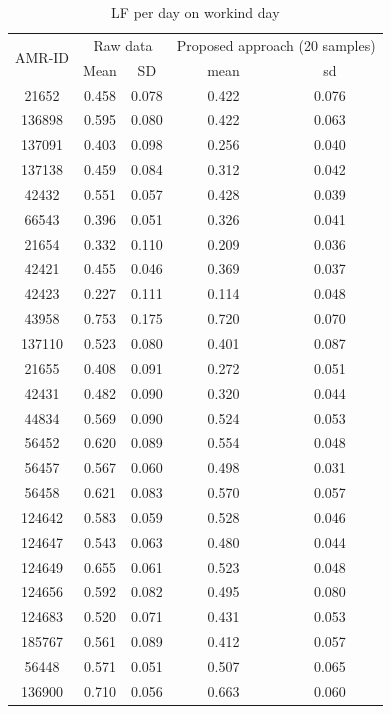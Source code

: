 \documentclass[conference]{IEEEtran}
\begin{document}
\begin{table}[]
  \caption{LF per day on workind day}
  \begin{center}
  \begin{tabular}{ccccc}
  \hline
  \multirow{2}{*}{AMR-ID} & \multicolumn{2}{c}{Raw data}               & \multicolumn{2}{c}{Proposed approach (20 samples)}\\
                          & \multicolumn{1}{c}{Mean} & \multicolumn{1}{c}{SD} & \multicolumn{1}{c}{mean}  & \multicolumn{1}{c}{sd} \\
  \hline

  21652 & 0.458 & 0.078 & 0.422 & 0.076 \\
136898 & 0.595 & 0.080 & 0.422 & 0.063 \\
137091 & 0.403 & 0.098 & 0.256 & 0.040 \\
137138 & 0.459 & 0.084 & 0.312 & 0.042 \\
42432 & 0.551 & 0.057 & 0.428 & 0.039 \\
66543 & 0.396 & 0.051 & 0.326 & 0.041 \\
21654 & 0.332 & 0.110 & 0.209 & 0.036 \\
42421 & 0.455 & 0.046 & 0.369 & 0.037 \\
42423 & 0.227 & 0.111 & 0.114 & 0.048 \\
43958 & 0.753 & 0.175 & 0.720 & 0.070 \\
137110 & 0.523 & 0.080 & 0.401 & 0.087 \\
21655 & 0.408 & 0.091 & 0.272 & 0.051 \\
42431 & 0.482 & 0.090 & 0.320 & 0.044 \\
44834 & 0.569 & 0.090 & 0.524 & 0.053 \\
56452 & 0.620 & 0.089 & 0.554 & 0.048 \\
56457 & 0.567 & 0.060 & 0.498 & 0.031 \\
56458 & 0.621 & 0.083 & 0.570 & 0.057 \\
124642 & 0.583 & 0.059 & 0.528 & 0.046 \\
124647 & 0.543 & 0.063 & 0.480 & 0.044 \\
124649 & 0.655 & 0.061 & 0.523 & 0.048 \\
124656 & 0.592 & 0.082 & 0.495 & 0.080 \\
124683 & 0.520 & 0.071 & 0.431 & 0.053 \\
185767 & 0.561 & 0.089 & 0.412 & 0.057 \\
56448 & 0.571 & 0.051 & 0.507 & 0.065 \\
136900 & 0.710 & 0.056 & 0.663 & 0.060 \\

\end{tabular}
\end{center}
\end{table}
\end{document}
